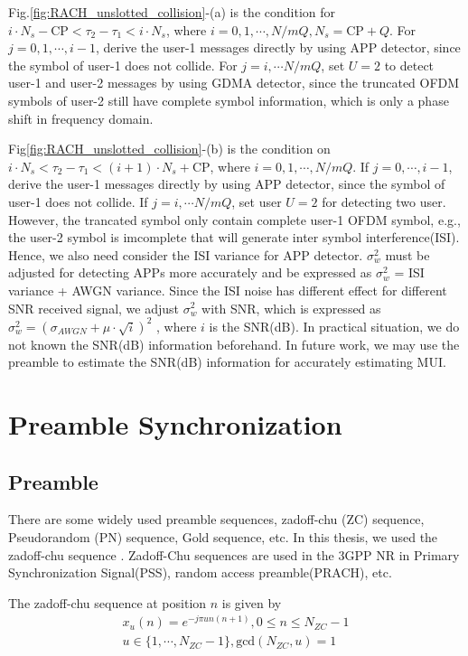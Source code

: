 Fig.\ref{fig:RACH_unslotted_collision}-(a) is the condition for $i \cdot N_s-\text{CP} < \tau_2 - \tau_ 1 < i \cdot N_s$, where $i=0, 1,  \cdots , N/mQ, N_s = \text{CP} + Q$. For $j=0,1, \cdots ,i-1$, derive the user-1 messages directly by using APP detector, since the symbol of user-1 does not collide. For $j=i, \cdots N/mQ$, set $U=2$ to detect user-1 and user-2 messages by using GDMA detector, since the truncated OFDM symbols of user-2 still have complete symbol information, which is only a phase shift in frequency domain.
   
Fig\ref{fig:RACH_unslotted_collision}-(b) is the condition on $ i \cdot N_s < \tau_2 - \tau_1 < (i+1) \cdot N_s + \text{CP}$, where $i=0, 1, \cdots,N/mQ$. If $j=0, \cdots, i-1$, derive the user-1 messages directly by using APP detector, since the symbol of user-1 does not collide.  If $j=i, \cdots N/mQ$, set user $U=2$ for detecting two user. However, the trancated symbol only contain complete user-1 OFDM symbol, e.g., the user-2 symbol is imcomplete that will generate inter symbol interference(ISI). Hence, we also need consider the ISI variance for APP detector. $\sigma_w^2$ must be adjusted for detecting APPs more accurately and be expressed as $\sigma_w^2$ = ISI variance + AWGN variance. Since the ISI noise has different effect for different SNR received signal, we adjust $\sigma_w^2$ with SNR, which is expressed as
$\sigma_w^2 = {( \sigma_{AWGN} + \mu \cdot \sqrt{i} )}^2$
, where $i$ is the SNR(dB). In practical situation, we do not known the SNR(dB) information beforehand. In future work, we may use the preamble to estimate the SNR(dB) information for accurately estimating MUI.


\section{Preamble Synchronization}
\subsection{Preamble}

There are some widely used preamble sequences, zadoff-chu (ZC) sequence, Pseudorandom (PN) sequence, Gold sequence, etc. In this thesis, we used the zadoff-chu sequence \cite{zepernick2013pseudo}. Zadoff-Chu sequences are used in the 3GPP NR in Primary Synchronization Signal(PSS), random access preamble(PRACH), etc. 

The zadoff-chu sequence at position $n$ is given by
\begin{align}
x_u(n) = e^{-j \pi u n (n+1)}, 0 \leq n \leq N_{ZC}-1 \\
u \in \{ 1, \cdots, N_{ZC}-1 \}, \text{gcd} (N_{ZC},u) = 1
\end{align}

